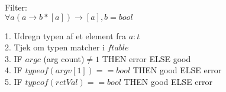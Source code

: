 \documentclass[12pt,a4paper]{article}
\begin{document}
Filter: \\
$\forall a (a \rightarrow b * [a]) \rightarrow [a], b = bool $


1. Udregn typen af et element fra $a: t$\\
2. Tjek om typen matcher i $ftable$ \\	
3. IF $argc$ (arg count)$\ne 1$ THEN error ELSE good\\
4. IF $typeof(argv[1]) == bool$ THEN good ELSE error\\
5. IF $ typeof(retVal) == bool $ THEN good ELSE error\\
\end{document}
